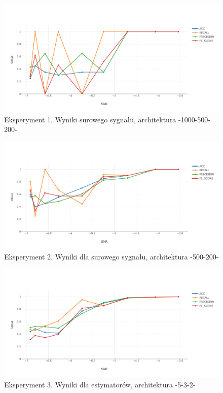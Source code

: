 \documentclass[inzynierska]{pwr_wmat_praca_dyplomowa}
\theoremstyle{plain}
\numberwithin{theorem}{chapter}
\theoremstyle{definition}
\numberwithin{theorem}{chapter}
\begin{document}
\begin{figure}[ht]
	\centering
	\includegraphics[width=14cm]{images/nn_full_1000_500_200.pdf}
	\caption{ Eksperyment 1. Wyniki surowego sygnału, architektura -1000-500-200-}
	\label{wynik-sur-1000-500-200}
\end{figure}

\begin{figure}[ht]
	\centering
	\includegraphics[width=14cm]{images/nn_full_signal_500_200.pdf}
	\caption{Eksperyment 2. Wyniki dla surowego sygnału, architektura -500-200-}
	\label{wynik-sur-500-200}
\end{figure}

\begin{figure}[H]
	\centering
	\includegraphics[width=14cm]{images/nn_small_532.pdf}
	\caption{ Eksperyment 3. Wyniki dla estymatorów, architektura -5-3-2-}
	\label{wynik-est-5-3-2}
\end{figure}
\end{document}
